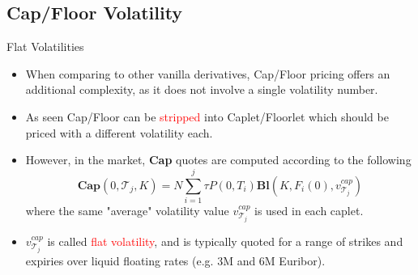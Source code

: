 \documentclass{beamer}
\begin{document}
\subsection{Cap/Floor Volatility}
\begin{frame}{Flat Volatilities}
	\begin{itemize}
		\item When comparing to other vanilla derivatives, Cap/Floor pricing offers an additional complexity, as it does not involve a single volatility number. 
		\item As seen Cap/Floor can be \textcolor{red}{stripped} into Caplet/Floorlet which should be priced with a different volatility each. 
		\item However, in the market, \textbf{Cap} quotes are computed according to the following 
		\begin{equation*}
			\textbf{Cap}(0,\mathcal{T}_j,K)=N\sum_{i=1}^{j}\tau P(0,T_i) \textbf{Bl}(K,F_i(0),v_{\mathcal{T}_j}^{cap})
		\end{equation*}
		where the same "average" volatility value $v_{\mathcal{T}_j}^{cap}$ is used in each caplet. 
		\item $v_{\mathcal{T}_j}^{cap}$ is called \textcolor{red}{flat volatility}, and is typically quoted for a range of strikes and expiries over liquid floating rates (e.g. 3M and 6M Euribor).
	\end{itemize}
\end{frame}
\end{document}
